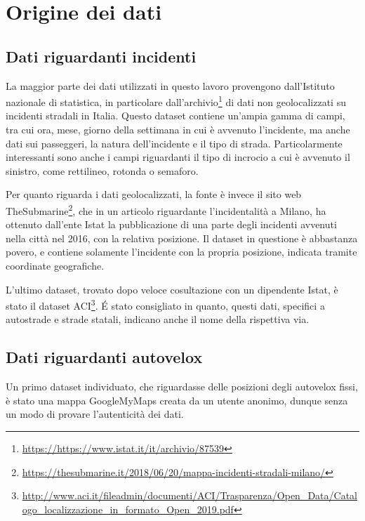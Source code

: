 \documentclass[a4paper]{report}
\begin{document}
\section{Origine dei dati}

\subsection{Dati riguardanti incidenti}
La maggior parte dei dati utilizzati in questo lavoro provengono 
dall'Istituto nazionale di statistica, 
in particolare dall'archivio\footnote{\url{https://https://www.istat.it/it/archivio/87539}} 
di dati non geolocalizzati su incidenti stradali in Italia.
Questo dataset contiene un'ampia gamma di campi, tra cui ora, 
mese, giorno della settimana in cui è avvenuto l'incidente, 
ma anche dati sui passeggeri, la natura dell'incidente e il tipo di strada. 
Particolarmente interessanti sono anche i campi riguardanti il tipo di incrocio a cui è 
avvenuto il sinistro, come rettilineo, rotonda o semaforo.

Per quanto riguarda i dati geolocalizzati, 
la fonte è invece il sito web TheSubmarine\footnote{\url{https://thesubmarine.it/2018/06/20/mappa-incidenti-stradali-milano/}},
che in un articolo riguardante l'incidentalità a Milano, 
ha ottenuto dall'ente Istat la pubblicazione di una parte degli 
incidenti avvenuti nella città nel 2016, con la relativa posizione.
Il dataset in questione è abbastanza povero, e contiene solamente l'incidente con la 
propria posizione, indicata tramite coordinate geografiche.

L'ultimo dataset, trovato dopo veloce cosultazione con un dipendente Istat, è stato 
il dataset ACI\footnote{\url{http://www.aci.it/fileadmin/documenti/ACI/Trasparenza/Open_Data/Catalogo_localizzazione_in_formato_Open_2019.pdf}}.
\'E stato consigliato in quanto, questi dati, specifici a autostrade e strade statali, 
indicano anche il nome della rispettiva via.

\subsection{Dati riguardanti autovelox}
Un primo dataset individuato, che riguardasse delle posizioni degli autovelox fissi, 
è stato una mappa GoogleMyMaps
creata da un utente anonimo, dunque senza un modo di provare l'autenticità dei dati.
\end{document}
